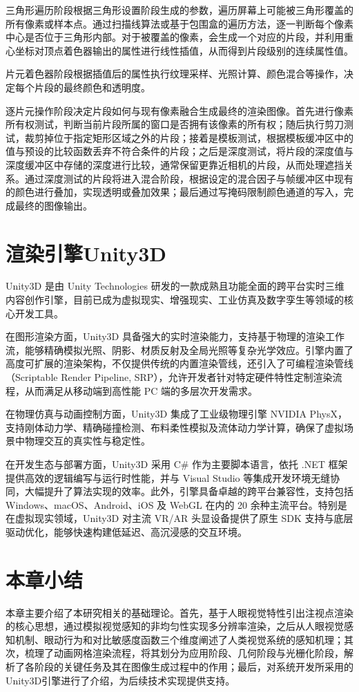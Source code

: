 三角形遍历阶段根据三角形设置阶段生成的参数，遍历屏幕上可能被三角形覆盖的所有像素或样本点。通过扫描线算法或基于包围盒的遍历方法，逐一判断每个像素中心是否位于三角形内部。对于被覆盖的像素，会生成一个对应的片段，并利用重心坐标对顶点着色器输出的属性进行线性插值，从而得到片段级别的连续属性值。

片元着色器阶段根据插值后的属性执行纹理采样、光照计算、颜色混合等操作，决定每个片段的最终颜色和透明度。

逐片元操作阶段决定片段如何与现有像素融合生成最终的渲染图像。首先进行像素所有权测试，判断当前片段所属的窗口是否拥有该像素的所有权；随后执行剪刀测试，裁剪掉位于指定矩形区域之外的片段；接着是模板测试，根据模板缓冲区中的值与预设的比较函数丢弃不符合条件的片段；之后是深度测试，将片段的深度值与深度缓冲区中存储的深度进行比较，通常保留更靠近相机的片段，从而处理遮挡关系。通过深度测试的片段将进入混合阶段，根据设定的混合因子与帧缓冲区中现有的颜色进行叠加，实现透明或叠加效果；最后通过写掩码限制颜色通道的写入，完成最终的图像输出。

\section{渲染引擎Unity3D}

Unity3D 是由 Unity Technologies 研发的一款成熟且功能全面的跨平台实时三维内容创作引擎，目前已成为虚拟现实、增强现实、工业仿真及数字孪生等领域的核心开发工具。

在图形渲染方面，Unity3D 具备强大的实时渲染能力，支持基于物理的渲染工作流，能够精确模拟光照、阴影、材质反射及全局光照等复杂光学效应。引擎内置了高度可扩展的渲染架构，不仅提供传统的内置渲染管线，还引入了可编程渲染管线（Scriptable Render Pipeline, SRP），允许开发者针对特定硬件特性定制渲染流程，从而满足从移动端到高性能 PC 端的多层次开发需求。

在物理仿真与动画控制方面，Unity3D 集成了工业级物理引擎 NVIDIA PhysX，支持刚体动力学、精确碰撞检测、布料柔性模拟及流体动力学计算，确保了虚拟场景中物理交互的真实性与稳定性。

在开发生态与部署方面，Unity3D 采用 C\# 作为主要脚本语言，依托 .NET 框架提供高效的逻辑编写与运行时性能，并与 Visual Studio 等集成开发环境无缝协同，大幅提升了算法实现的效率。此外，引擎具备卓越的跨平台兼容性，支持包括 Windows、macOS、Android、iOS 及 WebGL 在内的 20 余种主流平台。特别是在虚拟现实领域，Unity3D 对主流 VR/AR 头显设备提供了原生 SDK 支持与底层驱动优化，能够快速构建低延迟、高沉浸感的交互环境。

\section{本章小结}

本章主要介绍了本研究相关的基础理论。首先，基于人眼视觉特性引出注视点渲染的核心思想，通过模拟视觉感知的非均匀性实现多分辨率渲染，之后从人眼视觉感知机制、眼动行为和对比敏感度函数三个维度阐述了人类视觉系统的感知机理；其次，梳理了动画网格渲染流程，将其划分为应用阶段、几何阶段与光栅化阶段，解析了各阶段的关键任务及其在图像生成过程中的作用；最后，对系统开发所采用的Unity3D引擎进行了介绍，为后续技术实现提供支持。
